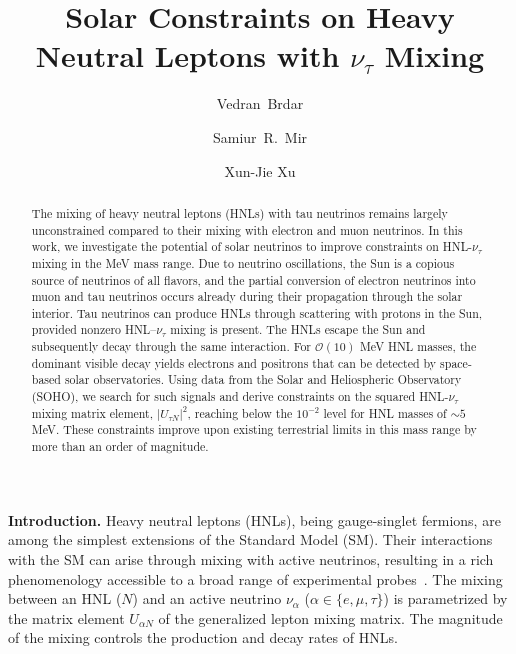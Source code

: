 \documentclass[aps,prd,twocolumn,preprintnumbers,superscriptaddress,nofootinbib]{revtex4-1}
\begin{document}
\title{Solar Constraints on Heavy Neutral Leptons with $\nu_\tau$ Mixing}


\author{Vedran~Brdar}
\author{Samiur~R.~Mir}
\author{Xun-Jie Xu}


\begin{abstract}
The mixing of heavy neutral leptons (HNLs) with tau neutrinos remains largely unconstrained compared to their mixing with electron and muon neutrinos. In this work, we investigate the potential of solar neutrinos to improve constraints on HNL-$\nu_\tau$ mixing in the MeV mass range. Due to neutrino oscillations, the Sun is a copious source of neutrinos of all flavors, and the partial conversion of electron neutrinos into muon and tau neutrinos occurs already during their propagation through the solar interior. Tau neutrinos can produce HNLs through scattering with protons in the Sun, provided nonzero HNL–$\nu_\tau$ mixing is present. The HNLs escape the Sun and subsequently decay through the same interaction. For $\mathcal{O}(10)$ MeV HNL masses, the dominant visible decay yields electrons and positrons that can be detected by space-based solar observatories. Using data from the Solar and Heliospheric Observatory (SOHO), we search for such signals and derive constraints on the squared HNL-$\nu_\tau$ mixing matrix element, $|U_{\tau N}|^2$, reaching below the $10^{-2}$ level for HNL masses of $\sim 5$ MeV. These constraints improve upon existing terrestrial limits in this mass range by more than an order of magnitude.
\end{abstract}

\maketitle
\textbf{Introduction.} 
\noindent
Heavy neutral leptons (HNLs), being gauge-singlet fermions, are among the simplest extensions of the Standard Model (SM).
Their interactions with the SM can arise through mixing with active neutrinos, resulting in a rich phenomenology accessible to a broad range of experimental probes~\cite{Atre:2009rg,deGouvea:2015euy,Bolton:2019pcu,Fernandez-Martinez:2023phj}. The mixing between an HNL ($N$) and an active neutrino $\nu_\alpha$ ($\alpha\in\{e,\mu,\tau\}$) is parametrized by the matrix element $U_{\alpha N}$ of the generalized lepton mixing matrix. The magnitude of the mixing controls the production and decay rates of HNLs. 
\end{document}
